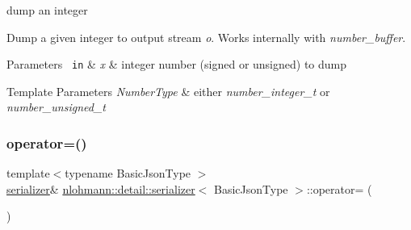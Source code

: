 dump an integer 

Dump a given integer to output stream {\itshape o}. Works internally with {\itshape number\+\_\+buffer}.


\begin{DoxyParams}[1]{Parameters}
\mbox{\texttt{ in}}  & {\em x} & integer number (signed or unsigned) to dump \\
\hline
\end{DoxyParams}

\begin{DoxyTemplParams}{Template Parameters}
{\em Number\+Type} & either {\itshape number\+\_\+integer\+\_\+t} or {\itshape number\+\_\+unsigned\+\_\+t} \\
\hline
\end{DoxyTemplParams}
\mbox{\label{classnlohmann_1_1detail_1_1serializer_a5f14c33012477b9f9876dc54d97009a0}} 
\subsubsection{\texorpdfstring{operator=()}{operator=()}\hspace{0.1cm}{\footnotesize\ttfamily [1/2]}}
{\footnotesize\ttfamily template$<$typename Basic\+Json\+Type $>$ \\
\mbox{\hyperlink{classnlohmann_1_1detail_1_1serializer}{serializer}}\& \mbox{\hyperlink{classnlohmann_1_1detail_1_1serializer}{nlohmann\+::detail\+::serializer}}$<$ Basic\+Json\+Type $>$\+::operator= (\begin{DoxyParamCaption}\item[{const \mbox{\hyperlink{classnlohmann_1_1detail_1_1serializer}{serializer}}$<$ Basic\+Json\+Type $>$ \&}]{ }\end{DoxyParamCaption})\hspace{0.3cm}{\ttfamily [delete]}}

\mbox{\label{classnlohmann_1_1detail_1_1serializer_acaafe3436ee5fb74777eb4132a88c513}} 
